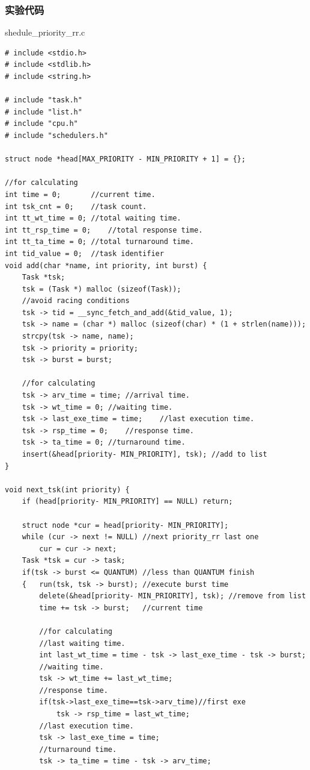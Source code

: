 \documentclass{article}
\begin{document}
\subsubsection{实验代码}
\begin{center}
{\ttfamily shedule\_priority\_rr.c}
\end{center}
\begin{lstlisting}[language={[ANSI]C}]
# include <stdio.h>
# include <stdlib.h>
# include <string.h>

# include "task.h"
# include "list.h"
# include "cpu.h"
# include "schedulers.h"

struct node *head[MAX_PRIORITY - MIN_PRIORITY + 1] = {}; 

//for calculating
int time = 0;		//current time.
int tsk_cnt = 0;	//task count.
int tt_wt_time = 0;	//total waiting time.
int tt_rsp_time = 0;	//total response time.
int tt_ta_time = 0;	//total turnaround time.
int tid_value = 0;	//task identifier
void add(char *name, int priority, int burst) {
	Task *tsk;
	tsk = (Task *) malloc (sizeof(Task));
	//avoid racing conditions
	tsk -> tid = __sync_fetch_and_add(&tid_value, 1);
	tsk -> name = (char *) malloc (sizeof(char) * (1 + strlen(name)));
	strcpy(tsk -> name, name);
	tsk -> priority = priority;
	tsk -> burst = burst;

	//for calculating
	tsk -> arv_time = time;	//arrival time.
	tsk -> wt_time = 0;	//waiting time.
	tsk -> last_exe_time = time;	//last execution time.
	tsk -> rsp_time = 0;	//response time.
	tsk -> ta_time = 0;	//turnaround time.
	insert(&head[priority- MIN_PRIORITY], tsk);	//add to list
}

void next_tsk(int priority) {
	if (head[priority- MIN_PRIORITY] == NULL) return;
	
	struct node *cur = head[priority- MIN_PRIORITY];
	while (cur -> next != NULL) //next priority_rr last one
		cur = cur -> next;
	Task *tsk = cur -> task;
	if(tsk -> burst <= QUANTUM)	//less than QUANTUM finish
	{	run(tsk, tsk -> burst);	//execute burst time
		delete(&head[priority- MIN_PRIORITY], tsk);	//remove from list
		time += tsk -> burst;	//current time

		//for calculating
		//last waiting time.
		int last_wt_time = time - tsk -> last_exe_time - tsk -> burst;
		//waiting time.	
		tsk -> wt_time += last_wt_time;
		//response time.	
		if(tsk->last_exe_time==tsk->arv_time)//first exe
			tsk -> rsp_time = last_wt_time;
		//last execution time.	
		tsk -> last_exe_time = time;
		//turnaround time.
		tsk -> ta_time = time - tsk -> arv_time;
	

\end{lstlisting}
\end{document}
